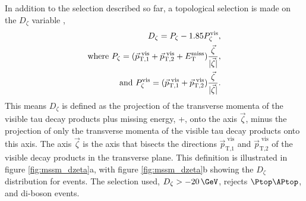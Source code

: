 In addition to the selection described so far,
 a topological selection is made on the $D_{\zeta}$ variable \cite{cdf-dzeta},
\begin{align}\label{eqn:mssm_em_dzeta}
D_{\zeta} = P_{\zeta} - 1.85 P_{\zeta}^{\text{vis}}, \notag \\
\text{where } P_{\zeta} = (\vec{p}_{\text{T},1}^{\text{  vis}} + \vec{p}_{\text{T},2}^{\text{  vis}} + E_{\text{T}}^{\text{miss}})\frac{\vec{\zeta}}{|\vec{\zeta}|}, \notag \\
\text{and } P_{\zeta}^{\text{vis}} = (\vec{p}_{\text{T},1}^{\text{  vis}}+\vec{p}_{\text{T},2}^{\text{  vis}})\frac{\vec{\zeta}}{|\vec{\zeta}|}.
\end{align}
This means $D_{\zeta}$ is defined as the projection of the transverse momenta of the visible tau decay products plus missing energy, \pT+\MET, onto 
the axis $\vec{\zeta}$, minus the projection of only the transverse momenta of the visible tau decay products onto this axis.
The axis $\vec{\zeta}$ is the axis that bisects
the directions $\vec{p}_{\text{T,1}}^{\text{  vis}}$ and $\vec{p}_{\text{T,2}}^{\text{  vis}}$
of the visible decay products in the transverse plane. This definition is illustrated in figure
\ref{fig:mssm_dzeta}a, with figure \ref{fig:mssm_dzeta}b showing the $D_{\zeta}$ distribution
for \emu events. The selection used, $D_{\zeta} > -20\,\GeV$, rejects $\ttbar$, \Wjets and di-boson
events. 


